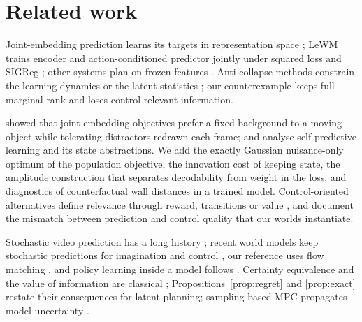 \section{Related work}
\label{sec:related}

Joint-embedding prediction learns its targets in representation space
\citep{lecun2022path,assran2023ijepa,bardes2024vjepa}; LeWM trains encoder and action-conditioned
predictor jointly under squared loss and SIGReg \citep{maes2026lewm,balestriero2025lejepa}; other
systems plan on frozen features \citep{assran2025vjepa2,zhou2024dinowm,sobal2025pldm}. Anti-collapse
methods constrain the learning dynamics or the latent statistics
\citep{grill2020byol,chen2021simsiam,zbontar2021barlow,bardes2022vicreg,jing2022dimensional}; our
counterexample keeps full marginal rank and loses control-relevant information.

\citet{sobal2022slow} showed that joint-embedding objectives prefer a fixed background to a moving
object while tolerating distractors redrawn each frame; \citet{tang2023selfpredictive} and \citet{ni2024bridging} analyse self-predictive learning and its state abstractions. We add the exactly Gaussian nuisance-only optimum of the population objective, the innovation cost of keeping state, the amplitude construction that separates decodability from weight in the loss, and diagnostics of counterfactual wall distances in a trained model. Control-oriented alternatives define relevance through reward, transitions or value
\citep{ferns2004bisimulation,zhang2021dbc,grimm2020value,farahmand2017vaml,tishby2000ib}, and
\citet{lambert2020objective} document the mismatch between prediction and control quality that our
worlds instantiate.

Stochastic video prediction has a long history
\citep{mathieu2016beyond,babaeizadeh2018sv2p,denton2018svg,lee2018savp}; recent world models keep
stochastic predictions for imagination and control
\citep{hafner2019planet,hafner2023dreamerv3,alonso2024diamond,bruce2024genie,hafner2025dreamer4}, our
reference uses flow matching \citep{lipman2023flowmatching,chen2024diffusionforcing}, and policy
learning inside a model follows \citet{sutton1991dyna,ha2018worldmodels,hafner2020dreamer}.
Certainty equivalence and the value of information are classical
\citep{simon1956dynamic,theil1957note,howard1966information,barshalom1974dual};
Propositions~\ref{prop:regret} and \ref{prop:exact} restate their consequences for latent planning; sampling-based MPC propagates model uncertainty \citep{chua2018pets}.
